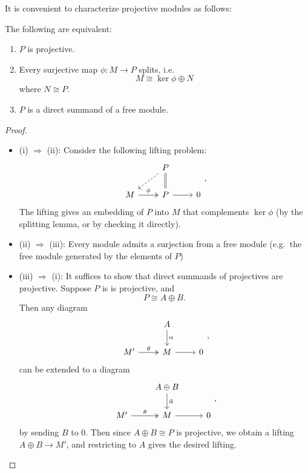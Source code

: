 \documentclass[a4paper]{article}
\begin{document}
It is convenient to characterize projective modules as follows:
\begin{lemma}
  The following are equivalent:
  \begin{enumerate}
    \item $P$ is projective.
    \item Every surjective map $\phi: M \to P$ splits, i.e.
      \[
        M \cong \ker \phi \oplus N
      \]
      where $N \cong P$.
    \item $P$ is a direct summand of a free module.
  \end{enumerate}
\end{lemma}

\begin{proof}\leavevmode
  \begin{itemize}
    \item (i) $\Rightarrow$ (ii): Consider the following lifting problem:
      \[
        \begin{tikzcd}
          & P \ar[d, equals] \ar[dl, dashed]\\
          M \ar[r, two heads, "\phi"] & P \ar[r] & 0
        \end{tikzcd},
      \]
      The lifting gives an embedding of $P$ into $M$ that complements $\ker \phi$ (by the splitting lemma, or by checking it directly).
    \item (ii) $\Rightarrow$ (iii): Every module admits a surjection from a free module (e.g.\ the free module generated by the elements of $P$)
    \item (iii) $\Rightarrow$ (i): It suffices to show that direct summands of projectives are projective. Suppose $P$ is is projective, and
      \[
        P \cong A \oplus B.
      \]
      Then any diagram
      \[
        \begin{tikzcd}
          & A \ar[d, "\alpha"]\\
          M' \ar[r, two heads, "\theta"] & M \ar[r] & 0
        \end{tikzcd},
      \]
      can be extended to a diagram
      \[
        \begin{tikzcd}
          & A \oplus B \ar[d, "\tilde{\alpha}"]\\
          M' \ar[r, two heads, "\theta"] & M \ar[r] & 0
        \end{tikzcd},
      \]
      by sending $B$ to $0$. Then since $A \oplus B \cong P$ is projective, we obtain a lifting $A \oplus B \to M'$, and restricting to $A$ gives the desired lifting.
  \end{itemize}
\end{proof}
\end{document}
